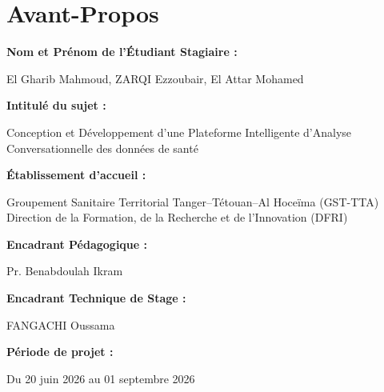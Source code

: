\chapter*{Avant-Propos}
\begin{center}
\large
\textbf{Nom et Prénom de l'Étudiant Stagiaire :}
\end{center}
\begin{center}
El Gharib Mahmoud, ZARQI  Ezzoubair, El Attar Mohamed
\end{center}


\begin{center}
\large
\textbf{Intitulé du sujet :}
\end{center}
\begin{center}
Conception et Développement d'une Plateforme Intelligente d'Analyse Conversationnelle des données de santé
\end{center}


\begin{center}
\large
\textbf{Établissement d'accueil :}
\end{center}
\begin{center}
Groupement Sanitaire Territorial Tanger--Tétouan--Al Hoceïma (GST-TTA) \\
Direction de la Formation, de la Recherche et de l'Innovation (DFRI)
\end{center}


\begin{center}
\large
\textbf{Encadrant Pédagogique :}
\end{center}
\begin{center}
Pr. Benabdoulah Ikram
\end{center}



\begin{center}
\large
\textbf{Encadrant Technique de Stage :}
\end{center}
\begin{center}
FANGACHI Oussama
\end{center}


\begin{center}
\large
\textbf{Période de projet :}
\end{center}
\begin{center}
Du 20 juin 2026 au 01 septembre 2026
\end{center}



